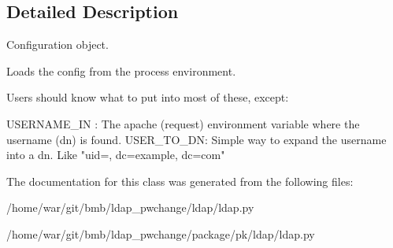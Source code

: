 \subsection{Detailed Description}
\begin{DoxyVerb}Configuration object.

     Loads the config from the process environment.

     Users should know what to put into most of these, except:

     USERNAME_IN :
         The apache (request) environment variable where the username (dn) is found.
     USER_TO_DN: 
         Simple way to expand the username into a dn. Like "uid={}, dc=example, dc=com"\end{DoxyVerb}
 

The documentation for this class was generated from the following files\-:\begin{DoxyCompactItemize}
\item 
/home/war/git/bmb/ldap\-\_\-pwchange/ldap/ldap.\-py\item 
/home/war/git/bmb/ldap\-\_\-pwchange/package/pk/ldap/ldap.\-py\end{DoxyCompactItemize}
